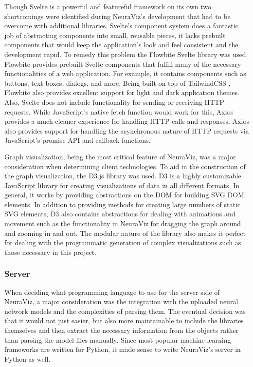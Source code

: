 Though Svelte is a powerful and featureful framework on its own two shortcomings were identified during NeuraViz's development that had to be overcome with additional libraries. Svelte's component system does a fantastic job of abstracting components into small, reusable pieces, it lacks prebuilt components that would keep the application's look and feel consistent and the development rapid. To remedy this problem the Flowbite Svelte library \cite{flowbite} was used. Flowbite provides prebuilt Svelte components that fulfill many of the necessary functionalities of a web application. For example, it contains components such as buttons, text boxes, dialogs, and more. Being built on top of TailwindCSS \cite{tailwind}, Flowbite also provides excellent support for light and dark application themes. Also, Svelte does not include functionality for sending or receiving HTTP requests. While JavaScript's native fetch function would work for this, Axios \cite{axios} provides a much cleaner experience for handling HTTP calls and responses. Axios also provides support for handling the asynchronous nature of HTTP requests via JavaScript's promise API and callback functions.

Graph visualization, being the most critical feature of NeuraViz, was a major consideration when determining client technologies. To aid in the construction of the graph visualization, the D3.js library \cite{d3} was used. D3 is a highly customizable JavaScript library for creating visualizations of data in all different formats. In general, it works by providing abstractions on the DOM for building SVG DOM elements. In addition to providing methods for creating large numbers of static SVG elements, D3 also contains abstractions for dealing with animations and movement such as the functionality in NeuraViz for dragging the graph around and zooming in and out. The modular nature of the library also makes it perfect for dealing with the programmatic generation of complex visualizations such as those necessary in this project.

\subsubsection{Server}
When deciding what programming language to use for the server side of NeuraViz, a major consideration was the integration with the uploaded neural network models and the complexities of parsing them. The eventual decision was that it would not just easier, but also more maintainable to include the libraries themselves and then extract the necessary information from the objects rather than parsing the model files manually. Since most popular machine learning frameworks are written for Python, it made sense to write NeuraViz's server in Python as well. 

